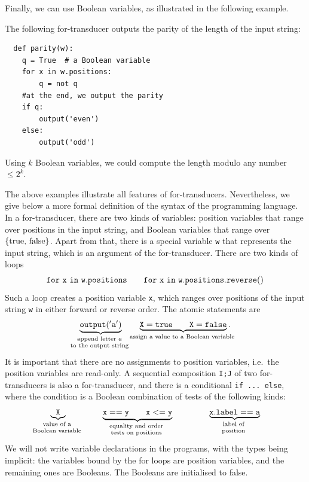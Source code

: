 Finally, we can use Boolean variables, as illustrated in the following example. 

\begin{myexample}[Parity]\label{ex:parity-for-transducer}
    The following for-transducer outputs the parity of the length of the  input string:
    \begin{lstlisting}
  def parity(w):
    q = True  # a Boolean variable
    for x in w.positions:
        q = not q
    #at the end, we output the parity
    if q:
        output('even')
    else:
        output('odd')
\end{lstlisting}
Using $k$ Boolean variables, we could compute the length modulo any number $\le 2^k$.
\end{myexample}


The above examples illustrate all features of for-transducers. Nevertheless, we give below a more formal definition of the syntax of the programming language. In a for-transducer, there  are two kinds of variables: position variables that range over positions in the input string, and Boolean variables that range over $\{\text{true, false}\}$.   Apart from that, there is a special variable {\tt w} that represents the input string, which is an argument of the for-transducer.
There are  two kinds of loops 
\begin{eqnarray*}
    {\tt for\ x\ in\  w.positions} \qquad {\tt for\ x\ in\ w.positions.reverse()}
\end{eqnarray*}
Such a loop creates a position variable {\tt x}, which ranges over positions of the input string {\tt w} in either forward or reverse order. The atomic statements are 
\begin{eqnarray*}
   \myunderbrace{{\tt output('a')}}{append letter $a$ \\ \scriptsize to the output string} \qquad 
   \myunderbrace{{\tt X = true} \qquad {\tt X = false}}{assign a value to a Boolean variable}.
\end{eqnarray*}
It is important that there are no assignments to position variables, i.e.~the position variables are read-only.
A sequential composition {\tt I;J} of two for-transducers is also a for-transducer, and there is a conditional {\tt if ... else}, where  the condition is a Boolean combination of tests of the following kinds:
\begin{align*}
\myunderbrace{{\tt X}}{value of a\\ \scriptsize
 Boolean variable} \hspace{1.5cm} 
 \myunderbrace{\tt x == \tt y \qquad \tt x <= \tt y }{equality and order  \\ \scriptsize  tests on positions}
 \hspace{1.5cm} 
 \myunderbrace{\mathtt{x.label == a}}{label of  \\  \scriptsize position}
\end{align*}
We will not write variable declarations in the programs, with the types being implicit: the variables bound by the for loops are  position variables, and the remaining ones are  Booleans. The Booleans are initialised to false.


